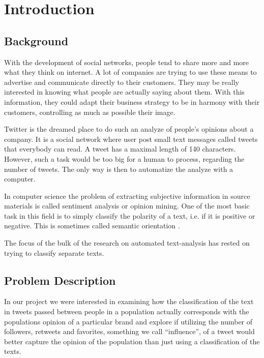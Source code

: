 \documentclass[a4paper,12pt]{report}
\begin{document}
\tableofcontents

\clearpage
\chapter{Introduction}

\section{Background}

With the development of social networks, people tend to share more and more what they think on internet.
A lot of companies are trying to use these means to advertise and communicate directly to their customers.
They may be really interested in knowing what people are actually saying about them.
With this information, they could adapt their business strategy to be in harmony with their customers, controlling as much as possible their image.

Twitter is the dreamed place to do such an analyze of people's opinions about a company. It is a social network where user post small text messages called tweets that everybody can read. A tweet has a maximal length of 140 characters. However, such a task would be too big for a human to process, regarding the number of tweets. The only way is then to automatize the analyze with a computer.

In computer science the problem of extracting subjective information in source materials is called sentiment analysis or opinion mining. 
One of the most basic task in this field is to simply classify the polarity of a text, i.e. if it is positive or negative. 
This is sometimes called semantic orientation \cite{SenWiki}. 

The focus of the bulk of the research on automated text-analysis has rested on trying to classify separate texts.


\section{Problem Description}

In our project we were interested in examining how the classification of the text in tweets passed between people in a population actually corresponds with the populations opinion of a particular brand and explore if utilizing the number of followers, retweets and favorites, something we call ``influence'', of a tweet would better capture the opinion of the population than just using a classification of the texts. 
\end{document}
